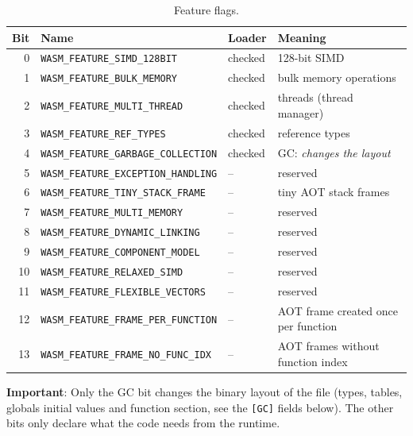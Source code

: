 \documentclass{article}
\begin{document}
\begin{itemize}
        \begin{table}[H]
        \centering
        \begin{tabular}{rlll}
            \hline
            Bit & Name & Loader & Meaning \\
            \hline
            0  & \verb|WASM_FEATURE_SIMD_128BIT|        & checked & 128-bit SIMD \\
            1  & \verb|WASM_FEATURE_BULK_MEMORY|        & checked & bulk memory operations \\
            2  & \verb|WASM_FEATURE_MULTI_THREAD|       & checked & threads (thread manager) \\
            3  & \verb|WASM_FEATURE_REF_TYPES|          & checked & reference types \\
            4  & \verb|WASM_FEATURE_GARBAGE_COLLECTION| & checked & GC: \emph{changes the layout} \\
            5  & \verb|WASM_FEATURE_EXCEPTION_HANDLING| & --      & reserved \\
            6  & \verb|WASM_FEATURE_TINY_STACK_FRAME|   & --      & tiny AOT stack frames \\
            7  & \verb|WASM_FEATURE_MULTI_MEMORY|       & --      & reserved \\
            8  & \verb|WASM_FEATURE_DYNAMIC_LINKING|    & --      & reserved \\
            9  & \verb|WASM_FEATURE_COMPONENT_MODEL|    & --      & reserved \\
            10 & \verb|WASM_FEATURE_RELAXED_SIMD|       & --      & reserved \\
            11 & \verb|WASM_FEATURE_FLEXIBLE_VECTORS|   & --      & reserved \\
            12 & \verb|WASM_FEATURE_FRAME_PER_FUNCTION| & --      & AOT frame created once per function \\
            13 & \verb|WASM_FEATURE_FRAME_NO_FUNC_IDX|  & --      & AOT frames without function index \\
            \hline
        \end{tabular}
        \caption{Feature flags.}
        \label{table:feature-flags}
        \end{table}

        \medskip
        \textbf{Important}: Only the GC bit changes the binary layout of the file (types, tables, globals initial values and function section, see the \texttt{[GC]} fields below).
        The other bits only declare what the code needs from the runtime.


\end{itemize}
\end{document}
